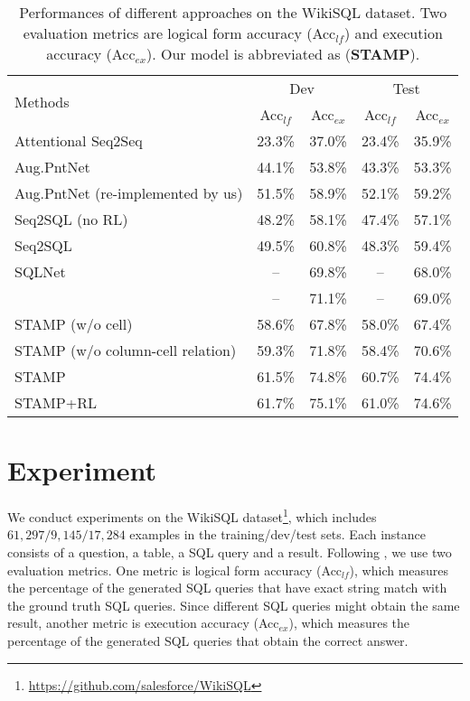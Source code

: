 \documentclass[11pt,a4paper]{article}
\begin{document}
\begin{table*}[t]
\centering
	\begin{tabular}{l|cc|cc}
		\hline
		\multirow{2}{*}{{Methods}} & \multicolumn{2}{c|}{Dev} & \multicolumn{2}{c}{Test} \\
		\cline{2-5}
		& {Acc$_{lf}$} & {Acc$_{ex}$} & {Acc$_{lf}$} & {Acc$_{ex}$}\\
		\hline
Attentional Seq2Seq & 23.3\%& 37.0\%& 23.4\%& 35.9\% \\
Aug.PntNet~\cite{zhong2017seq2sql} & 44.1\%& 53.8\%& 43.3\%& 53.3\% \\
		Aug.PntNet (re-implemented by us) &51.5\%& 58.9\%& 52.1\%& 59.2\% \\
Seq2SQL (no RL)~\cite{zhong2017seq2sql} &  48.2\%& 58.1\%& 47.4\% &57.1\% \\
Seq2SQL~\cite{zhong2017seq2sql} & 49.5\%& 60.8\%& 48.3\%& 59.4\%\\
SQLNet~\cite{xu2017sqlnet} & -- & 69.8\% & -- & 68.0\%\\
		\newcite{DBLP:journals/corr/abs-1801-00076} & -- & 71.1\%& -- & 69.0\%\\
\hline


		STAMP (w/o cell)& 58.6\%& 67.8\%& 58.0\%& 67.4\%\\
		STAMP (w/o column-cell relation) & 59.3\%& 71.8\%& 58.4\%& 70.6\%\\
		STAMP  & 61.5\%& 74.8\%& 60.7\%& 74.4\% \\
		STAMP+RL& 61.7\%&  75.1\%& 61.0\%&  74.6\%\\
\hline
	\end{tabular}
	\caption{Performances of different approaches on the WikiSQL dataset. Two evaluation metrics are logical form accuracy (Acc$_{lf}$) and execution accuracy (Acc$_{ex}$).
		Our model is abbreviated as (\textbf{STAMP}).}
\label{table:compare-to-other-alg}
\end{table*}
\section{Experiment}
We conduct experiments on the WikiSQL dataset\footnote{\url{https://github.com/salesforce/WikiSQL}}, which includes $61,297/9,145/17,284$ examples in the training/dev/test sets.
Each instance consists of a question, a table, a SQL query and a result.
Following , we use two evaluation metrics. One metric is logical form accuracy (Acc$_{lf}$), which measures the percentage of the generated SQL queries that have exact string match with the ground truth SQL queries.
Since different SQL queries might obtain the same result, another metric is
execution accuracy (Acc$_{ex}$), which measures the percentage of the generated SQL queries that obtain the correct answer.
\end{document}
